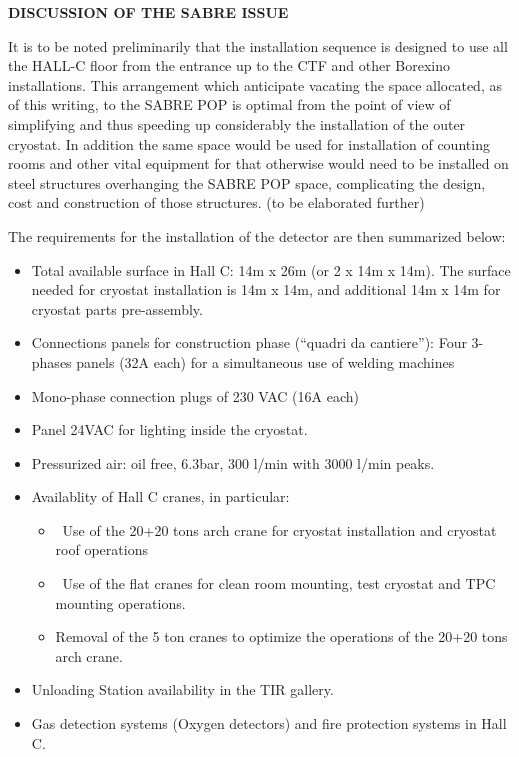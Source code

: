 \vspace{}

{\bf DISCUSSION OF THE SABRE ISSUE}

It is to be noted preliminarily that the installation sequence is designed to use all the HALL-C floor from the entrance up to the CTF and other Borexino installations. This arrangement which anticipate vacating the space allocated, as of this writing, to the SABRE POP is optimal from the point of view of simplifying and thus speeding up considerably the installation of the outer cryostat. In addition the same space would be used for installation of counting rooms and other vital equipment for 
\DSk that otherwise would need to be installed on steel structures overhanging the SABRE POP space, complicating the design, cost and construction of those structures.
(to be elaborated further)

\vspace{1cm}

The requirements for the installation of the \DSk detector are then summarized below:

\begin{itemize}

\item Total available surface in Hall C: 14m x 26m (or 2 x 14m x 14m). The surface needed for cryostat installation is 14m x 14m, and additional 14m x 14m for cryostat parts pre-assembly. 
\item Connections panels for construction phase (“quadri da cantiere”): Four 3-phases panels (32A each) for a simultaneous use of welding machines
\item Mono-phase connection plugs of 230 VAC (16A each)
\item Panel 24VAC for lighting inside the cryostat.
\item Pressurized air: oil free, 6.3bar, 300 l/min with 3000 l/min peaks.
\item Availablity of Hall C cranes, in particular:
\begin{itemize}[label=-]
\item Use of the 20+20 tons arch crane for cryostat installation and cryostat roof operations
\item Use of the flat cranes for clean room mounting, test cryostat and TPC mounting operations.
\item Removal of the 5 ton cranes to optimize the operations of the 20+20 tons arch crane.
\end{itemize}
\item Unloading Station availability in the TIR gallery.
\item Gas detection systems (Oxygen detectors) and fire protection systems in Hall C.

\end{itemize}

